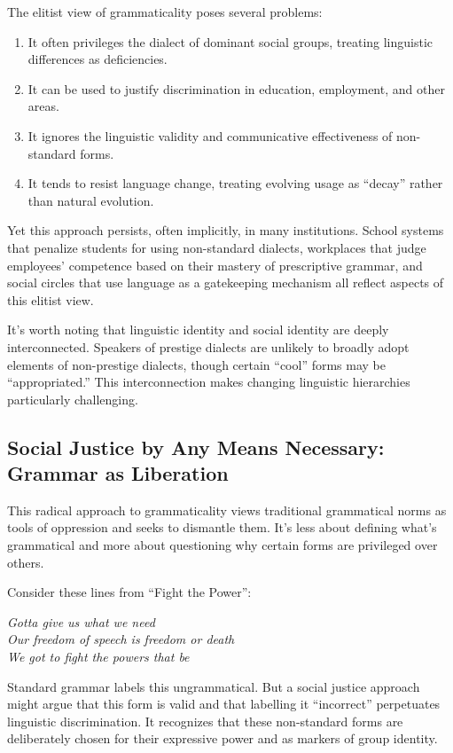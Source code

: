 The elitist view of grammaticality poses several problems:

\begin{enumerate}
    \item It often privileges the dialect of dominant social groups, treating linguistic differences as deficiencies.
    \item It can be used to justify discrimination in education, employment, and other areas.
    \item It ignores the linguistic validity and communicative effectiveness of non-standard forms.
    \item It tends to resist language change, treating evolving usage as ``decay'' rather than natural evolution.
\end{enumerate}

Yet this approach persists, often implicitly, in many institutions. School systems that penalize students for using non-standard dialects, workplaces that judge employees' competence based on their mastery of prescriptive grammar, and social circles that use language as a gatekeeping mechanism all reflect aspects of this elitist view.

It's worth noting that linguistic identity and social identity are deeply interconnected. Speakers of prestige dialects are unlikely to broadly adopt elements of non-pre\-stige dialects, though certain ``cool'' forms may be ``appropriated.'' This interconnection makes changing linguistic hierarchies particularly challenging.

\subsection{Social Justice by Any Means Necessary: Grammar as Liberation}

This radical approach to grammaticality views traditional grammatical norms as tools of oppression and seeks to dismantle them. It's less about defining what's grammatical and more about questioning why certain forms are privileged over others.

Consider these lines from ``Fight the Power'':

\ea
\textit{Gotta give us what we need\\
Our freedom of speech is freedom or death\\
We got to fight the powers that be}
\z

Standard grammar labels this ungrammatical. But a social justice approach might argue that this form is valid and that labelling it ``incorrect'' perpetuates linguistic discrimination. It recognizes that these non-standard forms are deliberately chosen for their expressive power and as markers of group identity.

